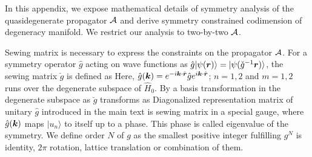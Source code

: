 \documentclass[aps, prb, showpacs, twocolumn, notitlepage, superscriptaddress]{revtex4-1}
\begin{document}
In this appendix, we expose mathematical details of symmetry analysis of the quasidegenerate propagator ${\cal A}$ and derive symmetry constrained codimension of degeneracy manifold. We restrict our analysis to two-by-two ${\cal A}$.


Sewing matrix is necessary to express the constraints on the propagator ${\cal A}$. For a symmetry operator $\hat{g}$ acting on wave functions as $\hat{g}|\psi(\boldsymbol{r})\rangle=|\psi(\check{g}^{-1}\boldsymbol{r})\rangle$, the sewing matrix $\breve{g}$ is defined as 
Here, $\hat{g}(\boldsymbol{k})=e^{-i\boldsymbol{k}\cdot\hat{\boldsymbol{r}}}\hat{g}e^{i\boldsymbol{k}\cdot\hat{\boldsymbol{r}}}$; $n=1,2$ and $m=1,2$ runs over the degenerate subspace of $\hat{H}_0$. By a basis transformation in the degenerate subspace as 
$\breve{g}$ transforms as
Diagonalized representation matrix of unitary $\hat{g}$ introduced in the main text is sewing matrix in a special gauge, where $\hat{g}(\boldsymbol{k})$ maps $|u_n\rangle$ to itself up to a phase. This phase is called eigenvalue of the symmetry. We define order $N$ of $g$ as the smallest positive integer fulfilling $g^N$ is identity, $2\pi$ rotation, lattice translation or combination of them.
\end{document}
